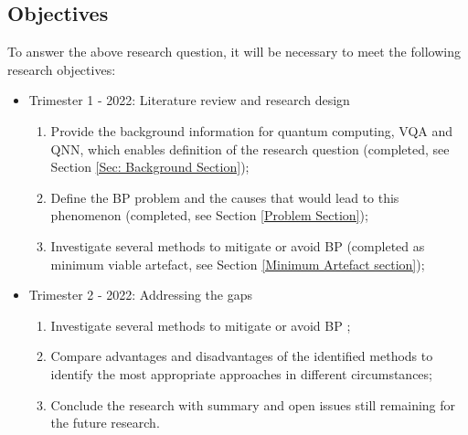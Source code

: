 \subsection{Objectives}
To answer the above research question, it will be necessary to meet the following research objectives:
\begin{itemize}
    \item Trimester 1 - 2022: Literature review and research design
          \begin{enumerate}
              \item Provide the background information for quantum computing, VQA and QNN, which enables definition of the research question (completed, see Section \ref{Sec: Background Section});
              \item Define the BP problem and the causes that would lead to this phenomenon \cite{wangNoiseinducedBarrenPlateaus2021,zhaoAnalyzingBarrenPlateau2021} (completed, see Section \ref{Problem Section});
              \item Investigate several methods to mitigate or avoid BP \cite{pesahAbsenceBarrenPlateaus2021, pattiEntanglementDevisedBarren2021,liuParameterInitializationMethod2021} (completed as minimum viable artefact, see Section \ref{Minimum Artefact section});
          \end{enumerate}
    \item Trimester 2 - 2022: Addressing the gaps
          \begin{enumerate}
              \item Investigate several methods to mitigate or avoid BP \cite{pesahAbsenceBarrenPlateaus2021, pattiEntanglementDevisedBarren2021,liuParameterInitializationMethod2021};
              \item Compare advantages and disadvantages of the identified methods to identify the most appropriate approaches in different circumstances;
              \item Conclude the research with summary and open issues still remaining for the future research.
          \end{enumerate}
\end{itemize}